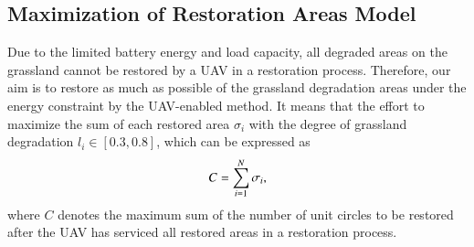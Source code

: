 \documentclass[preprint,5pt]{elsarticle}
\begin{document}
\subsection{Maximization of Restoration Areas Model}
Due to the limited battery energy and load capacity, all degraded areas on the grassland cannot be restored by a UAV in a restoration process. Therefore, our aim is to restore as much as possible of the grassland degradation areas under the energy constraint by the UAV-enabled method. It means that the effort to maximize the sum of each restored area $\sigma_i$ with the degree of grassland degradation $l_i \in [0.3, 0.8]$, which can be expressed as
\begin{equation} \label{maximize-the-sum}
\begin{small}
C = \sum^N_{i=1}\sigma_i,
\end{small}
\end{equation}
where $C$ denotes the maximum sum of the number of unit circles to be restored after the UAV has serviced all restored areas in a restoration process.
\end{document}
